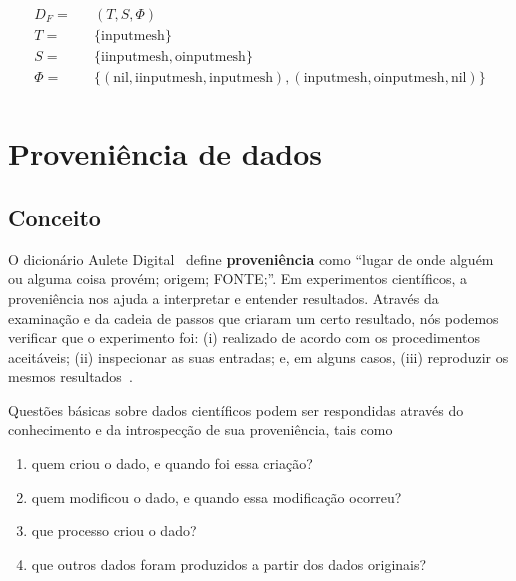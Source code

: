 \[
\begin{aligned}
D_F = && (T, S, \Phi) \\
T = && \{ \textrm{inputmesh} \} \\
S = && \{ \textrm{iinputmesh}, \textrm{oinputmesh} \} \\
\Phi = && \{ (\textrm{nil}, \textrm{iinputmesh}, \textrm{inputmesh}),
(\textrm{inputmesh}, \textrm{oinputmesh}, \textrm{nil})
\} \\
\end{aligned}
\]


\section{Proveniência de dados}

\subsection{Conceito}

O dicionário Aulete Digital~\cite{auletedigitalonline} define \textbf{proveniência} como
``lugar de onde alguém ou alguma coisa provém; origem; FONTE;''. Em experimentos científicos, a proveniência nos ajuda a interpretar e entender resultados. Através da examinação e da cadeia de passos que criaram um certo resultado, nós podemos verificar que o experimento foi: (i) realizado de acordo com os procedimentos aceitáveis; (ii) inspecionar as suas entradas; e, em alguns casos, (iii) reproduzir os mesmos resultados~\cite{freire2008provenance}.

Questões básicas sobre dados científicos podem ser respondidas através do conhecimento e da introspecção de sua proveniência, tais como

\begin{enumerate}
    \item quem criou o dado, e quando foi essa criação?
    \item quem modificou o dado, e quando essa modificação ocorreu?
    \item que processo criou o dado?
    \item que outros dados foram produzidos a partir dos dados originais?
\end{enumerate}

